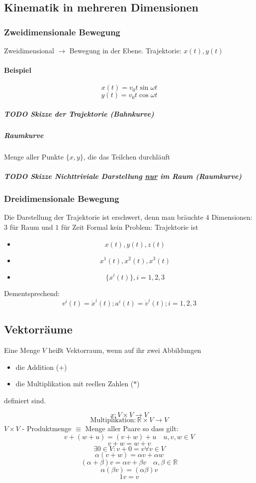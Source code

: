 \documentclass[a4paper]{scrartcl}
\DeclareMathOperator{\Forall}{\forall}
\theoremstyle{definition}
\theoremstyle{plain}
\theoremstyle{remark}
\theoremstyle{remark}
\begin{document}
\subsection{Kinematik in mehreren Dimensionen}
\label{sec-2-3}
\subsubsection{Zweidimensionale Bewegung}
\label{sec-2-3-1}
Zweidimensional $\rightarrow$ Bewegung in der Ebene. Trajektorie: $x(t),y(t)$
\paragraph{Beispiel}
\label{sec-2-3-1-1}
\[x(t) = v_0 t \sin{\omega t}\]
\[y(t) = v_0 t \cos{\omega t}\]
\subparagraph{{\bfseries\sffamily TODO} Skizze der Trajektorie (Bahnkurve)}
\label{sec-2-3-1-1-1}
\subparagraph{Raumkurve}
\label{sec-2-3-1-1-2}
Menge aller Punkte $\{x,y\}$, die das Teilchen durchläuft
\subparagraph{{\bfseries\sffamily TODO} Skizze Nichttriviale Darstellung \underline{nur} im Raum (Raumkurve)}
\label{sec-2-3-1-1-3}
\subsubsection{Dreidimensionale Bewegung}
\label{sec-2-3-2}
Die Darstellung der Trajektorie ist erschwert, denn man bräuchte $4$ Dimensionen: $3$ für Raum und $1$ für Zeit
Formal kein Problem: Trajektorie ist
\begin{itemize}
\item \[x(t),y(t),z(t)\]
\item \[x^1(t),x^2(t),x^3(t)\]
\item \[\{x^i(t)\},i=1,2,3\]
\end{itemize}

Dementsprechend:
\[v^i(t) = \dot{x}^i(t); a^i(t) = \dot{v}^i(t); i=1,2,3\]
\subsection{Vektorräume}
\label{sec-2-4}
Eine Menge $V$ heißt Vektorraum, wenn auf ihr zwei Abbildungen
\begin{itemize}
\item die Addition ($+$)
\item die Multiplikation mit reellen Zahlen ($*$)
\end{itemize}
definiert sind.

\[x : V\times V \rightarrow V\]
\[\text{Multiplikation}: \mathbb{R}\times V \rightarrow V\]
$V\times V$ - Produktmenge $\equiv$ Menge aller Paare
so dass gilt:
\[v + (w + u) = (v + w) + u\quad u,v,w\in V\tag*{Assoziativität}\]
\[v+w = w+v\tag*{Kommutativität}\]
\[\exists 0 \in V: v + 0 = v \Forall v\in V\tag*{Null}\]
\[\alpha(v+w) = \alpha v + \alpha w \tag*{Distributivität}\]
\[(\alpha + \beta)v = \alpha v + \beta v \quad \alpha,\beta \in \mathbb{R}\tag*{Distributivität}\]
\[\alpha(\beta v) = (\alpha\beta) v\tag*{Assoziativität der Multiplikation}\]
\[1 v = v \tag*{Multiplikation mit Eins}\]
\end{document}
